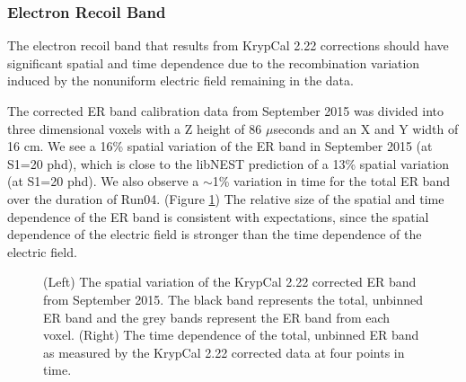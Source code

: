\documentclass[a4paper,12pt]{article}
\begin{document}
{\subsubsection{Electron Recoil Band}

The electron recoil band that results from KrypCal 2.22 corrections should have significant spatial and time dependence due to the recombination variation induced by the nonuniform electric field remaining in the data. 

The corrected ER band calibration data from September 2015 was divided into three dimensional voxels with a Z height of 86 $\mu$seconds and an X and Y width of 16 cm.  We see a 16\% spatial variation of the ER band in September 2015 (at S1=20 phd), which is close to the libNEST prediction of a 13\% spatial variation (at S1=20 phd).  We also observe a $\sim$1\% variation in time for the total ER band over the duration of Run04. (Figure \ref{ERBandVariation}) The relative size of the spatial and time dependence of the ER band is consistent with expectations, since the spatial dependence of the electric field is stronger than the time dependence of the electric field. 


\begin{figure} 
\centering
{}
\qquad
{}
\caption{ (Left) The spatial variation of the KrypCal 2.22 corrected ER band from September 2015.  The black band represents the total, unbinned ER band and the grey bands represent the ER band from each voxel. (Right) The time dependence of the total, unbinned ER band as measured by the KrypCal 2.22 corrected data at four points in time.}
\label{ERBandVariation}
\end{figure}

}
\end{document}
